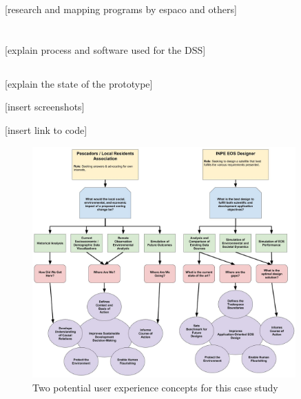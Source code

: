 [research and mapping programs by espaco and others]

\section{} \label{sec:rio-dss}

\subsection{}

[explain process and software used for the DSS]

\subsection{}

[explain the state of the prototype]

[insert screenshots]

[insert link to code]

\begin{figure}[t] 
\centering
\includegraphics[width=0.9\textwidth]{Figures/chap4/concept_flow.jpg}
\caption[Two potential user experience concepts for the Rio de Janeiro case study]{Two potential user experience concepts for this case study}
\label{fig:concept_flow}
\end{figure}

\section{} \label{sec:rio-collab}


